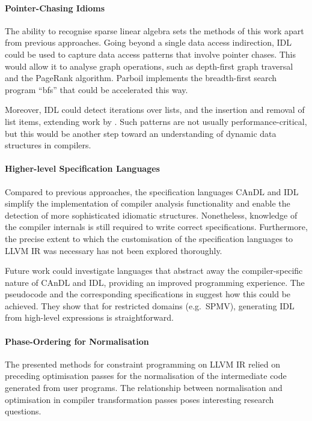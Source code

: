 \paragraph*{Pointer-Chasing Idioms}

    The ability to recognise sparse linear algebra sets the methods of this
    work apart from previous approaches.
    Going beyond a single data access indirection, IDL could be used to capture
    data access patterns that involve pointer chases.
    This would allow it to analyse graph operations, such as depth-first graph
    traversal and the PageRank algorithm.
    Parboil implements the breadth-first search program ``bfs'' that could be
    accelerated this way.

    Moreover, IDL could detect iterations over lists, and the insertion and
    removal of list items, extending work by
    \citet{Manilov:2018:GPI:3178372.3179511}.
    Such patterns are not usually performance-critical, but this would be
    another step toward an understanding of dynamic data structures in compilers.

    \paragraph*{Higher-level Specification Languages}
    Compared to previous approaches, the specification languages CAnDL and IDL
    simplify the implementation of compiler analysis functionality and enable
    the detection of more sophisticated idiomatic structures.
    Nonetheless, knowledge of the compiler internals is still required to write
    correct specifications.
    Furthermore, the precise extent to which the customisation of the
    specification languages to LLVM IR was necessary has not been explored
    thoroughly.

    Future work could investigate languages that abstract away the
    compiler-specific nature of CAnDL and IDL, providing an improved programming
    experience.
    The pseudocode and the corresponding specifications in
     suggest how this could be
    achieved.
    They show that for restricted domains (e.g.\ SPMV), generating IDL
    from high-level expressions is straightforward.

    \paragraph*{Phase-Ordering for Normalisation}
    The presented methods for constraint programming on LLVM IR relied on
    preceding optimisation passes for the normalisation of the intermediate
    code generated from user programs.
    The relationship between normalisation and optimisation in compiler
    transformation passes poses interesting research questions.

